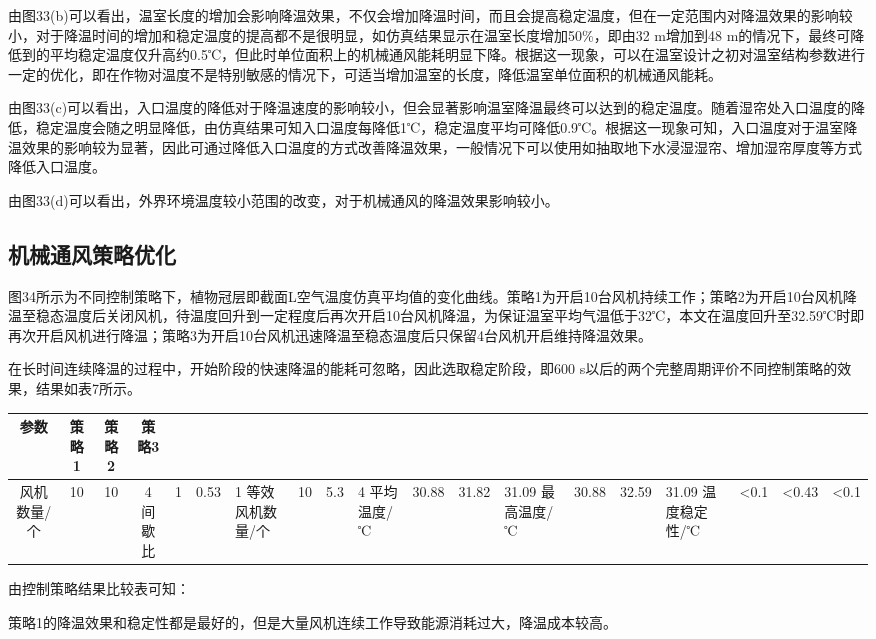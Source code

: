 由图33(b)可以看出，温室长度的增加会影响降温效果，不仅会增加降温时间，而且会提高稳定温度，但在一定范围内对降温效果的影响较小，对于降温时间的增加和稳定温度的提高都不是很明显，如仿真结果显示在温室长度增加50\%，即由32 m增加到48 m的情况下，最终可降低到的平均稳定温度仅升高约0.5℃，但此时单位面积上的机械通风能耗明显下降。根据这一现象，可以在温室设计之初对温室结构参数进行一定的优化，即在作物对温度不是特别敏感的情况下，可适当增加温室的长度，降低温室单位面积的机械通风能耗。

由图33(c)可以看出，入口温度的降低对于降温速度的影响较小，但会显著影响温室降温最终可以达到的稳定温度。随着湿帘处入口温度的降低，稳定温度会随之明显降低，由仿真结果可知入口温度每降低1℃，稳定温度平均可降低0.9℃。根据这一现象可知，入口温度对于温室降温效果的影响较为显著，因此可通过降低入口温度的方式改善降温效果，一般情况下可以使用如抽取地下水浸湿湿帘、增加湿帘厚度等方式降低入口温度。

由图33(d)可以看出，外界环境温度较小范围的改变，对于机械通风的降温效果影响较小。

	\subsection{机械通风策略优化}
	图34所示为不同控制策略下，植物冠层即截面L空气温度仿真平均值的变化曲线。策略1为开启10台风机持续工作；策略2为开启10台风机降温至稳态温度后关闭风机，待温度回升到一定程度后再次开启10台风机降温，为保证温室平均气温低于32℃，本文在温度回升至32.59℃时即再次开启风机进行降温；策略3为开启10台风机迅速降温至稳态温度后只保留4台风机开启维持降温效果。
	
	在长时间连续降温的过程中，开始阶段的快速降温的能耗可忽略，因此选取稳定阶段，即600 s以后的两个完整周期评价不同控制策略的效果，结果如表7所示。
		\begin{table}[!hpb]
  			\centering
  			\begin{tabular}{cccc} \toprule
			参数 & 策略1 & 策略2 & 策略3\\ \midrule
			风机数量/个 & 10 & 10 & 4
			间歇比 & 1 & 0.53 & 1
			等效风机数量/个 & 10 & 5.3 & 4
			平均温度/℃ & 30.88 & 31.82 & 31.09
			最高温度/℃ & 30.88 & 32.59 & 31.09
			温度稳定性/℃ & <0.1 & <0.43 & <0.1\\ \bottomrule
 			\end{tabular}
		\end{table}
	由控制策略结果比较表可知：
	
策略1的降温效果和稳定性都是最好的，但是大量风机连续工作导致能源消耗过大，降温成本较高。


